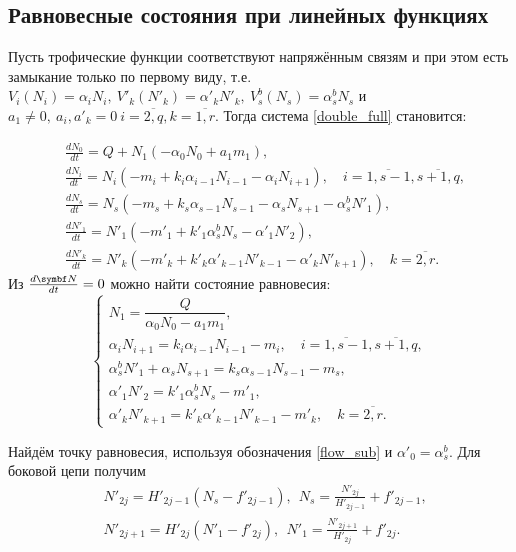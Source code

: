 \subsection{Равновесные состояния при линейных функциях}
Пусть трофические функции соответствуют напряжённым связям и при этом есть замыкание только по первому виду, т.е. \(V_i(N_i) = \alpha_i N_i, ~ V'_k(N'_k) = \alpha'_k N'_k, ~ V^b_s(N_s) = \alpha^b_s N_s\) и \( a_1 \neq 0, ~ a_i, a'_k = 0 ~ i=\overline{2,q}, k=\overline{1,r}\). Тогда система \eqref{double_full} становится:

\begin{equation} \label{double_lin}
    \begin{split}
        & \frac{d N_0}{dt} = Q + N_1 ( -\alpha_0 N_0 + a_1 m_1 ), \\
        & \frac{d N_i}{dt} = N_i (-m_i + k_i \alpha_{i-1} N_{i-1} - \alpha_i N_{i+1}), \quad i=\overline{1,s-1},  \overline{s+1,q}, \\
        & \frac{d N_s}{dt} = N_s ( -m_s + k_s \alpha_{s-1} N_{s-1} - \alpha_s N_{s+1} - \alpha_s^b N'_1 ), \\
        & \frac{d N'_1}{dt} = N'_1 ( -m'_1 + k'_1 \alpha_s^b N_s - \alpha'_1 N'_{2} ), \\
        & \frac{d N'_k}{dt} = N'_k ( -m'_k + k'_k \alpha'_{k-1} N'_{k-1} - \alpha'_k N'_{k+1} ), \quad k=\overline{2,r}.
    \end{split}
\end{equation}
Из \( \frac{d \mb{N}}{dt} = 0 \) можно найти состояние равновесия:
\begin{equation} \label{double_stab_system}
    \begin{cases}
        N_1 = \dfrac{Q}{ \alpha_0 N_0 - a_1 m_1 }, \\
        \alpha_i N_{i+1} = k_i \alpha_{i-1} N_{i-1} -m_i , \quad i=\overline{1,s-1},  \overline{s+1,q}, \\
        \alpha_s^b N'_1 + \alpha_s N_{s+1} = k_s \alpha_{s-1} N_{s-1} -m_s, \\
        \alpha'_1 N'_{2} = k'_1 \alpha_s^b N_s -m'_1, \\
        \alpha'_k N'_{k+1} = k'_k \alpha'_{k-1} N'_{k-1} -m'_k, \quad k=\overline{2,r}.
    \end{cases}
\end{equation}

Найдём точку равновесия, используя обозначения \eqref{flow_sub} и \(\alpha'_0 = \alpha^b_s\). Для боковой цепи получим
\begin{equation}
    \begin{split}
        & N'_{2j} = H'_{2j-1} (N_s - f'_{2j-1}), ~~ N_s = \frac{N'_{2j}}{H'_{2j-1}} + f'_{2j-1}, \\
        & N'_{2j+1} = H'_{2j} (N'_1 - f'_{2j}), ~~ N'_1 = \frac{N'_{2j+1}}{H'_{2j}} + f'_{2j}.
    \end{split}
\end{equation}

